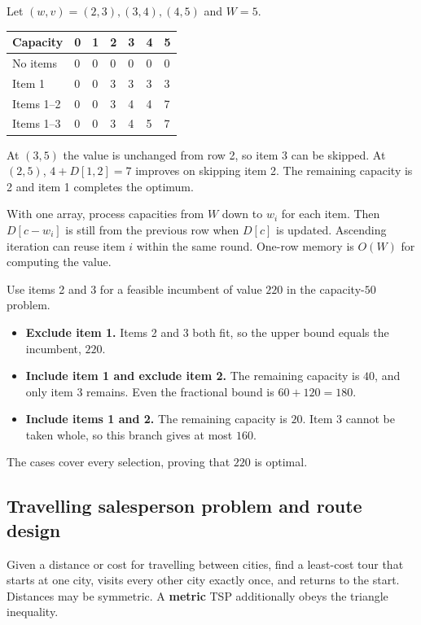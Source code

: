 \documentclass[12pt,a4paper]{article}
\begin{document}
\begin{tcolorbox}[examplebox, title={Fill a small DP and recover the selection}]
Let $(w,v)=(2,3),(3,4),(4,5)$ and $W=5$.
\par\vspace{5pt}
\begingroup
\setlength{\extrarowheight}{1pt}
\noindent\begin{tabularx}{\linewidth}{|B{2.55cm}|Y|Y|Y|Y|Y|Y|}
\hline
\textbf{Capacity} & \textbf{0} & \textbf{1} & \textbf{2} & \textbf{3} & \textbf{4} & \textbf{5} \\ \hline
No items & 0 & 0 & 0 & 0 & 0 & 0 \\ \hline
Item 1 & 0 & 0 & 3 & 3 & 3 & 3 \\ \hline
Items 1--2 & 0 & 0 & 3 & 4 & 4 & 7 \\ \hline
Items 1--3 & 0 & 0 & 3 & 4 & 5 & 7 \\ \hline
\end{tabularx}\par
\endgroup
At $(3,5)$ the value is unchanged from row 2, so item 3 can be skipped. At $(2,5)$, $4+D[1,2]=7$ improves on skipping item 2. The remaining capacity is 2 and item 1 completes the optimum.
\end{tcolorbox}

With one array, process capacities from $W$ down to $w_i$ for each item. Then $D[c-w_i]$ is still from the previous row when $D[c]$ is updated. Ascending iteration can reuse item $i$ within the same round. One-row memory is $O(W)$ for computing the value.
\begin{tcolorbox}[examplebox, title={A fractional upper bound in zero-one branch-and-bound}]
Use items 2 and 3 for a feasible incumbent of value $220$ in the capacity-$50$ problem.
\begin{itemize}[leftmargin=*, itemsep=2pt]
  \item \textbf{Exclude item 1.} Items 2 and 3 both fit, so the upper bound equals the incumbent, $220$.
  \item \textbf{Include item 1 and exclude item 2.} The remaining capacity is $40$, and only item 3 remains. Even the fractional bound is $60+120=180$.
  \item \textbf{Include items 1 and 2.} The remaining capacity is $20$. Item 3 cannot be taken whole, so this branch gives at most $160$.
\end{itemize}
The cases cover every selection, proving that $220$ is optimal.
\end{tcolorbox}

\subsection{Travelling salesperson problem and route design}
\begin{tcolorbox}[defbox, title={Travelling salesperson problem (TSP)}]
Given a distance or cost for travelling between cities, find a least-cost tour that starts at one city, visits every other city exactly once, and returns to the start. Distances may be symmetric. A \textbf{metric} TSP additionally obeys the triangle inequality.
\end{tcolorbox}
\end{document}
